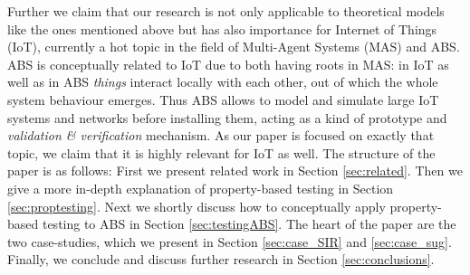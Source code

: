 
Further we claim that our research is not only applicable to theoretical models like the ones mentioned above but has also importance for Internet of Things (IoT), currently a hot topic in the field of Multi-Agent Systems (MAS) and ABS. ABS is conceptually related to IoT due to both having roots in MAS: in IoT as well as in ABS \textit{things} interact locally with each other, out of which the whole system behaviour emerges. Thus ABS allows to model and simulate large IoT systems and networks before installing them, acting as a kind of prototype and \textit{validation \& verification} mechanism. As our paper is focused on exactly that topic, we claim that it is highly relevant for IoT as well.
The structure of the paper is as follows: First we present related work in Section \ref{sec:related}. Then we give a more in-depth explanation of property-based testing in Section \ref{sec:proptesting}. Next we shortly discuss how to conceptually apply property-based testing to ABS in Section \ref{sec:testingABS}. The heart of the paper are the two case-studies, which we present in Section \ref{sec:case_SIR} and \ref{sec:case_sug}. Finally, we conclude and discuss further research in Section \ref{sec:conclusions}.
